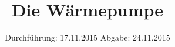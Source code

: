 

\subject{206}
\title{Die Wärmepumpe}
\date{
  Durchführung: 17.11.2015
  \hspace{3em}
  Abgabe: 24.11.2015
}



\maketitle
\thispagestyle{empty}
\tableofcontents
\newpage






\printbibliography


